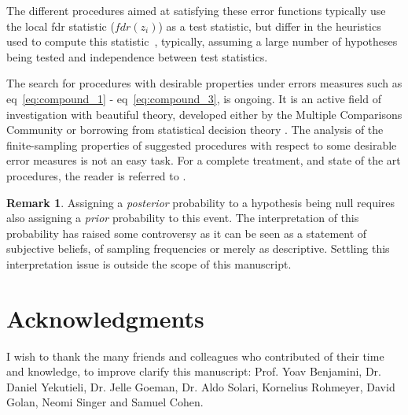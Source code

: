 \documentclass[review,12pt]{article}
\theoremstyle{definition}
\theoremstyle{definition}
\newtheorem{remark}{Remark}[section]
\begin{document}
The different procedures aimed at satisfying these error functions typically use the local fdr statistic ($fdr(z_i)$) as a test statistic, but differ in the heuristics used to  compute this statistic~\cite[eg.][]{storey_direct_2002,efron_microarrays_2008,sun_oracle_2007}, typically, assuming a large number of hypotheses being tested and independence between test statistics. 

The search for procedures with desirable properties under errors measures such as eq~\ref{eq:compound_1}  - eq~\ref{eq:compound_3}, is ongoing. It is an active field of investigation with beautiful theory, developed either by the Multiple Comparisons Community or borrowing from statistical decision theory \cite[see][]{sun_oracle_2007}. The analysis of the finite-sampling properties of suggested procedures with respect to some desirable error measures is not an easy task.  For a complete treatment, and state of the art procedures, the reader is referred to \cite{efron_large-scale_2010}.


\begin{remark}\label{sec:baeysian_interpretation}
Assigning a \emph{posterior} probability to a hypothesis being null requires also assigning a \emph{prior} probability to this event. The interpretation of this probability has raised some controversy \cite[e.g.][]{morris_comment:_2008} as it can be seen as a statement of subjective beliefs, of sampling frequencies or merely as descriptive. Settling this interpretation issue is outside the scope of this manuscript.
\end{remark}






\section{Acknowledgments}
I wish to thank the many friends and colleagues who contributed of their time and knowledge, to improve clarify this manuscript: 
Prof. Yoav Benjamini, Dr. Daniel Yekutieli, Dr. Jelle Goeman, Dr. Aldo Solari, Kornelius Rohmeyer, David Golan, Neomi Singer and Samuel Cohen.











\appendix
\end{document}
